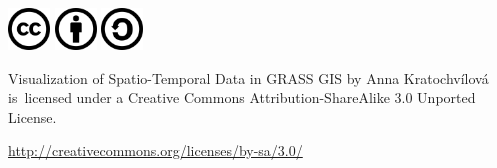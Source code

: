\cleardoublepage

\begin{center}

\newcommand{\logowidth}{3em}
\newcommand{\logospace}{\hspace{0.5em}}

\includegraphics[width=\logowidth]{./svg_images/cc}
\logospace
\includegraphics[width=\logowidth]{./svg_images/by}
\logospace
\includegraphics[width=\logowidth]{./svg_images/sa}

\bigskip

Visualization of Spatio-Temporal Data in GRASS GIS
by Anna Kratochvílová
is~licensed under a
Creative Commons Attribution-ShareAlike 3.0 Unported License.

\bigskip

\url{http://creativecommons.org/licenses/by-sa/3.0/}
\end{center}



